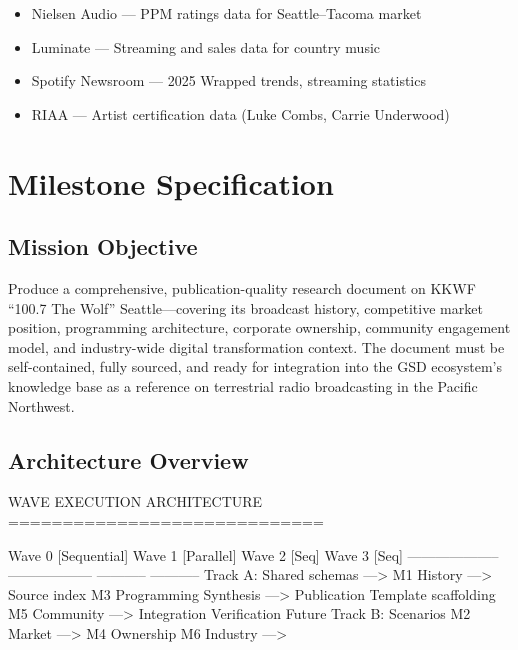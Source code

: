 \documentclass[11pt,letterpaper]{article}
\newcommand{\stageheader}[2]{%
  \noindent\colorbox{#2}{\makebox[\textwidth][l]{%
    \textcolor{white}{\bfseries\sffamily\hspace{6pt}#1\hspace{6pt}}}}%
  \vspace{0.5em}\par%
}
\begin{document}
\begin{itemize}[leftmargin=2em]
\item Nielsen Audio --- PPM ratings data for Seattle--Tacoma market
\item Luminate --- Streaming and sales data for country music
\item Spotify Newsroom --- 2025 Wrapped trends, streaming statistics
\item RIAA --- Artist certification data (Luke Combs, Carrie Underwood)
\end{itemize}

\newpage
\stageheader{STAGE 3 --- MISSION PACKAGE}{tertiary}

\section{Milestone Specification}

\subsection{Mission Objective}

Produce a comprehensive, publication-quality research document on KKWF ``100.7 The Wolf'' Seattle---covering its broadcast history, competitive market position, programming architecture, corporate ownership, community engagement model, and industry-wide digital transformation context. The document must be self-contained, fully sourced, and ready for integration into the GSD ecosystem's knowledge base as a reference on terrestrial radio broadcasting in the Pacific Northwest.

\subsection{Architecture Overview}

\begin{asciibox}
WAVE EXECUTION ARCHITECTURE
=============================

Wave 0 [Sequential]     Wave 1 [Parallel]        Wave 2 [Seq]    Wave 3 [Seq]
--------------------     ------------------        -----------     -----------
                         Track A:                  
Shared schemas    --->   M1 History      --->                     
Source index             M3 Programming            Synthesis  ---> Publication
Template scaffolding     M5 Community    --->      Integration     Verification
                                                   Future         
                         Track B:                  Scenarios       
                         M2 Market       --->                     
                         M4 Ownership              
                         M6 Industry     --->                     
\end{asciibox}
\end{document}
